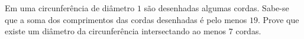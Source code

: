 Em uma circunferência de diâmetro $1$ são desenhadas algumas cordas. Sabe-se que a soma dos comprimentos das cordas desenhadas é pelo menos $19$. Prove que existe um diâmetro da circunferência intersectando ao menos $7$ cordas.
